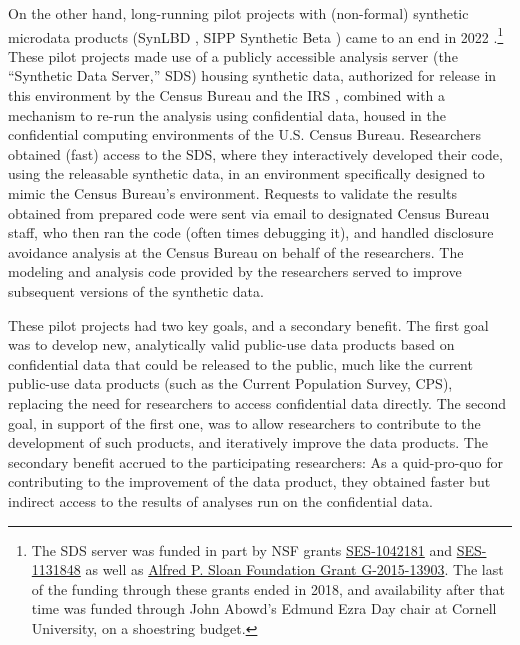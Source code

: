 \documentclass[]{hdsr}
\begin{document}
On the other hand, long-running pilot projects with (non-formal) synthetic microdata products (SynLBD \citep{KinneyEtAl2011,us_census_bureau_synthetic_2011,vilhuber_codebook_2013}, SIPP Synthetic Beta \citep{Benedettoetal_2013,us_census_bureau_sipp_2015,reeder_codebook_2018}) came to an end in 2022 \citep{vilhuber_end_2022}.\footnote{The SDS server was funded in part by NSF grants \href{http://www.nsf.gov/awardsearch/showAward.do?AwardNumber=1042181}{SES-1042181} and \href{http://www.nsf.gov/awardsearch/showAward.do?AwardNumber=1131848}{SES-1131848} as well as \href{https://sloan.org/grant-detail/6845}{Alfred P. Sloan Foundation Grant G-2015-13903}. The last of the funding through these grants ended in 2018, and availability after that time was funded through John Abowd's Edmund Ezra Day chair at Cornell University, on a shoestring budget.} These pilot projects made use of a publicly accessible analysis server  (the ``Synthetic Data Server,'' SDS) housing synthetic data, authorized for release in this environment by the Census Bureau and the IRS \citep[e.g.][]{us_census_bureau_disclosure_2015}, combined with a mechanism to re-run the analysis using confidential data, housed in the confidential computing environments of the U.S. Census Bureau. Researchers obtained (fast) access to the SDS, where they interactively developed their code, using the releasable synthetic data, in an environment specifically designed to mimic the Census Bureau's environment. Requests to validate the results obtained from prepared code were sent via email to designated Census Bureau staff, who then ran the code (often times debugging it), and handled disclosure avoidance analysis at the Census Bureau on behalf of the researchers. The modeling and analysis code provided by the researchers served to improve subsequent versions of the synthetic data. 

These pilot projects had two key goals, and a secondary benefit. The first goal was to develop new, analytically valid public-use data products based on confidential data that could be released to the public, much like the current public-use data products (such as the Current Population Survey, CPS), replacing the need for researchers to access confidential data directly. The second goal, in support of the first one, was to allow researchers to contribute to the development of such products, and iteratively improve the data products. The secondary benefit accrued to the participating researchers: As a quid-pro-quo for contributing to the improvement of the data product, they obtained faster but indirect access to the results of analyses run on the confidential data. 
\end{document}

